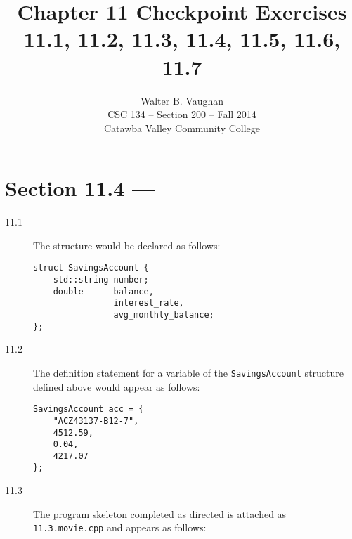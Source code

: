 \documentclass[11pt]{article}
\author{Walter B. Vaughan\\
        \small CSC 134 -- Section 200 -- Fall 2014\\
        \small Catawba Valley Community College}
\title{Chapter 11 Checkpoint Exercises \\
       \footnotesize{11.1, 11.2, 11.3, 11.4, 11.5, 11.6, 11.7}}
\date{\vspace{-5ex}}
\begin{document}
\maketitle


\section*{Section 11.4 --- }
\begin{description}

    \item[11.1] The structure would be declared as follows:
    \begin{lstlisting}
struct SavingsAccount {
    std::string number;
    double      balance,
                interest_rate,
                avg_monthly_balance;
};
\end{lstlisting}

    \item[11.2] The definition statement for a variable of the \lstinline{SavingsAccount} structure defined above would appear as follows:
    \begin{lstlisting}
SavingsAccount acc = {
    "ACZ43137-B12-7",
    4512.59,
    0.04,
    4217.07
};
\end{lstlisting}

    \item[11.3] The program skeleton completed as directed is attached as \texttt{11.3.movie.cpp} and appears as follows:
    

\end{description}
\end{document}
